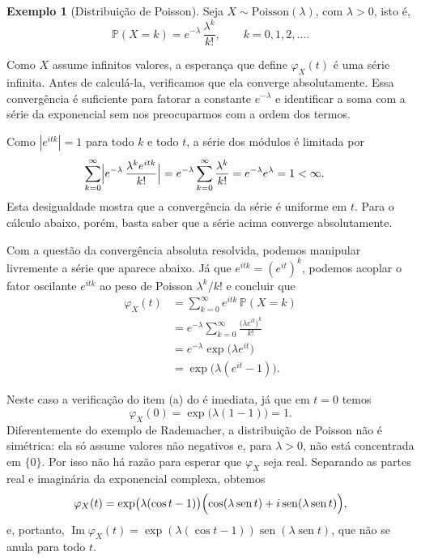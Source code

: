 \documentclass[12pt,portuguese]{article}
\theoremstyle{definition}
\newtheorem{example}[example]{Exemplo}
\theoremstyle{plainexercise}
\theoremstyle{starredexercise}
\theoremstyle{definition}
\renewcommand{\sin}{\operatorname{sen}}
\begin{document}
\begin{example}[Distribuição de Poisson]\label{ex:poisson}
Seja $X\sim\mathrm{Poisson}(\lambda)$, com $\lambda>0$, isto é,
\[
\mathbb{P}(X=k)=e^{-\lambda}\, \frac{\lambda^k}{k!}, \qquad k=0,1,2,\ldots.
\]

Como $X$ assume infinitos valores, a esperança que define $\varphi_X(t)$ é uma
série infinita. Antes de calculá-la, verificamos que ela converge absolutamente.
Essa convergência é suficiente para fatorar a constante $e^{-\lambda}$ e
identificar a soma com a série da exponencial sem nos preocuparmos com a ordem
dos termos.

Como $|e^{itk}|=1$ para todo $k$ e todo $t$, a série dos módulos é limitada por
\begin{align*}
\sum_{k=0}^{\infty}
\Bigl|e^{-\lambda}\,\frac{\lambda^{k}e^{itk}}{k!}\Bigr|
&= e^{-\lambda}\sum_{k=0}^{\infty}\frac{\lambda^{k}}{k!}
= e^{-\lambda}e^{\lambda}=1<\infty.
\end{align*}
Esta desigualdade mostra que a convergência da série é uniforme em $t$. 
Para o cálculo abaixo, porém, basta saber que a série acima converge absolutamente.

Com a questão da convergência absoluta resolvida, podemos manipular 
livremente a série que aparece abaixo. Já que
$e^{itk}=(e^{it})^{k}$, podemos acoplar o fator oscilante $e^{itk}$ ao peso
de Poisson $\lambda^{k}/k!$ e concluir que
\begin{align*}
\varphi_X(t)
&= \sum_{k=0}^{\infty} e^{itk}\,\mathbb{P}(X=k)
\\[0.3cm]
&= e^{-\lambda}\sum_{k=0}^{\infty}\frac{\bigl(\lambda e^{it}\bigr)^{k}}{k!}
\\[0.3cm]
&= e^{-\lambda}\exp\bigl(\lambda e^{it}\bigr)
\\[0.3cm]
&= \exp\bigl(\lambda(e^{it}-1)\bigr).
\end{align*}

Neste caso a verificação do item (a) do  é imediata, já que em $t=0$
temos 
\[ 
\varphi_X(0)=\exp\bigl(\lambda(1-1)\bigr)=1.
\] 
Diferentemente do exemplo de
Rademacher, a distribuição de Poisson não é simétrica: ela só assume valores não
negativos e, para $\lambda>0$, não está concentrada em $\{0\}$. Por isso não há
razão para esperar que $\varphi_X$ seja real. Separando as partes real e
imaginária da exponencial complexa, obtemos
\[
\varphi_X(t)
=\exp\bigl(\lambda(\cos t-1)\bigr)
\Bigl(\cos(\lambda\sin t)+i\sin(\lambda\sin t)\Bigr),
\]
e, portanto,
$\operatorname{Im}\varphi_X(t)=\exp(\lambda(\cos t-1))\sin(\lambda\sin t)$,
que não se anula para todo $t$.
\end{example}
\end{document}
